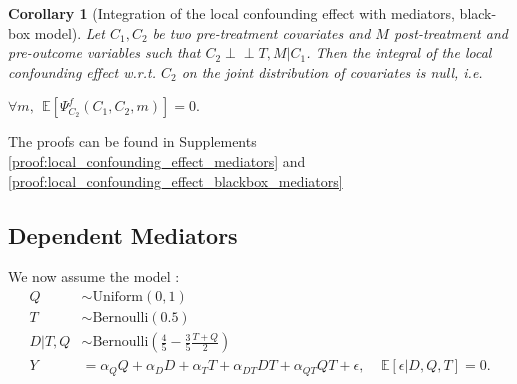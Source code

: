 \documentclass{article}
\theoremstyle{plain}
\newtheorem{corollary}[theorem]{Corollary}
\theoremstyle{definition}
\theoremstyle{remark}
\newcommand{\effect}{\Psi}
\theoremstyle{mystyle}
\newcommand{\indep}{\perp\!\!\!\!\perp}
\begin{document}
\begin{corollary}[Integration of the local confounding effect with mediators, black-box model] \label{cor:local_confounding_effect_blackbox_mediators}
 Let $C_1, C_2$ be two pre-treatment covariates and $M$ post-treatment and pre-outcome variables such that $C_2 \indep T, M | C_1$. Then the integral of the local confounding effect w.r.t. $C_2$ on the joint distribution of covariates is null, i.e.
\centerline{ $\forall m, \ \ \mathbb{E}[\effect^{f}_{C_2}(C_1,C_2,m)] = 0.$ }
\end{corollary}
The proofs can be found in Supplements \ref{proof:local_confounding_effect_mediators} and \ref{proof:local_confounding_effect_blackbox_mediators}

\subsection{Dependent Mediators}

We now assume the model :
\begin{align*}
    Q &\sim \text{Uniform}(0,1) \\
    T &\sim \text{Bernoulli}(0.5) \\
    D|T,Q &\sim \text{Bernoulli}(\frac{4}{5} - \frac{3}{5}\frac{T+Q}{2}) \\
    Y &= \alpha_Q Q + \alpha_D D + \alpha_T T + \alpha_{DT} DT + \alpha_{QT} QT + \epsilon, \ \ \ \ \ \mathbb{E}[\epsilon | D, Q, T] = 0.
\end{align*}
\end{document}
